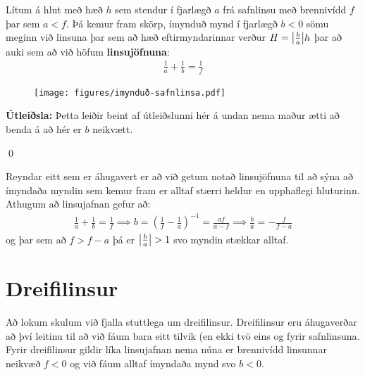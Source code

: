 \begin{tcolorbox}
\begin{theorem}
Lítum á hlut með hæð $h$ sem stendur í fjarlægð $a$ frá safnlinsu með brennivídd $f$ þar sem $a < f$. Þá kemur fram skörp, ímynduð mynd í fjarlægð $b < 0$ sömu meginn við linsuna þar sem að hæð eftirmyndarinnar verður $H = \abs{\frac{b}{a}}h$ þar að auki sem að við höfum \textbf{linsujöfnuna}:
\begin{align*}
    \frac{1}{a} + \frac{1}{b} = \frac{1}{f}
\end{align*}
\begin{figure}[H]
    \centering
    \texttt{[image: figures/imynduð-safnlinsa.pdf]}
\end{figure}
\end{theorem}
\end{tcolorbox}

\textbf{Útleiðsla:} Þetta leiðir beint af útleiðslunni hér á undan nema maður ætti að benda á að hér er $b$ neikvætt.

\qed

Reyndar eitt sem er áhugavert er að við getum notað linsujöfnuna til að sýna að ímyndaða myndin sem kemur fram er alltaf stærri heldur en upphaflegi hluturinn. Athugum að linsujafnan gefur að:
\begin{align*}
    \frac{1}{a} + \frac{1}{b} = \frac{1}{f} \implies b = \left( \frac{1}{f} - \frac{1}{a} \right)^{-1} = \frac{af}{a-f} \implies \frac{b}{a} = -\frac{f}{f-a}
\end{align*}
og þar sem að $f > f-a$ þá er $\abs{\frac{b}{a}} > 1$ svo myndin stækkar alltaf.


\section{Dreifilinsur}

Að lokum skulum við fjalla stuttlega um dreifilinsur. Dreifilinsur eru áhugaverðar að því leitinu til að við fáum bara eitt tilvik (en ekki tvö eins og fyrir safnlinsuna. Fyrir dreifilinsur gildir líka linsujafnan nema núna er brennivídd linsunnar neikvæð $f < 0$ og við fáum alltaf ímyndaða mynd svo $b < 0$.

